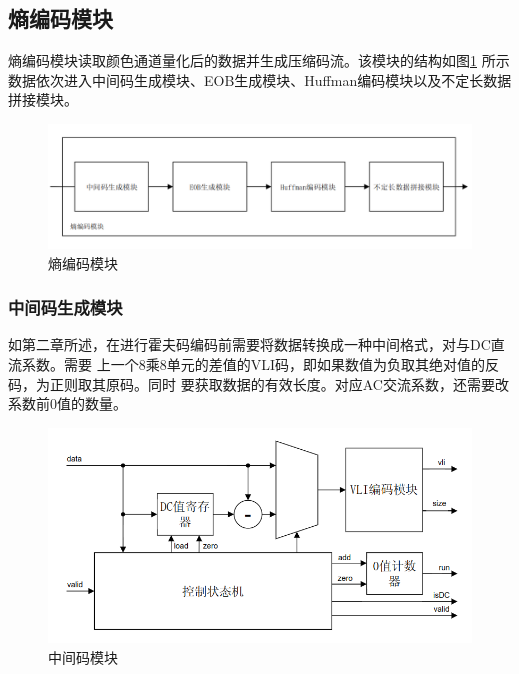 \documentclass{article}
\numberwithin {equation}{section}
\begin{document}
\begin{spacing}{1.25}
  \subsection{熵编码模块}
    熵编码模块读取颜色通道量化后的数据并生成压缩码流。该模块的结构如图\ref{enropyCoder}
    所示数据依次进入中间码生成模块、EOB生成模块、Huffman编码模块以及不定长数据拼接模块。
    \begin{figure}[H]
      \centering
      \includegraphics[scale=0.4]{./pictures/熵编码模块.png}
      \caption{熵编码模块}
      \label{enropyCoder}
    \end{figure}
    \subsubsection{中间码生成模块}
      \vspace{1em}
      如第二章所述，在进行霍夫码编码前需要将数据转换成一种中间格式，对与DC直流系数。需要
      上一个8乘8单元的差值的VLI码，即如果数值为负取其绝对值的反码，为正则取其原码。同时
      要获取数据的有效长度。对应AC交流系数，还需要改系数前0值的数量。
      \begin{figure}[H]
        \centering
        \includegraphics[scale=0.4]{./pictures/中间码生成模块.png}
        \caption{中间码模块}
        \label{tempGen}
      \end{figure}


\end{spacing}
\end{document}
